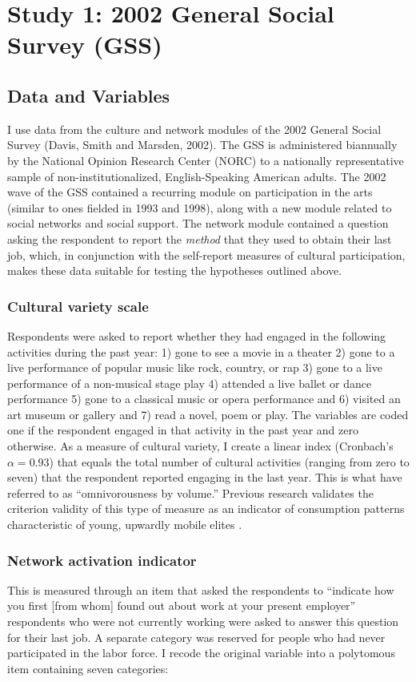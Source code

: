 \documentclass[12pt]{article}
\begin{document}
\section{Study 1:  2002 General Social Survey (GSS)}
\subsection{Data and Variables}
I use data from the culture and network modules of the 2002 General Social Survey (Davis, Smith and Marsden, 2002). The GSS is administered biannually by the National Opinion Research Center (NORC) to a nationally representative sample of non-institutionalized, English-Speaking American adults. The 2002 wave of the GSS contained a recurring module on participation in the arts (similar to ones fielded in 1993 and 1998), along with a new module related to social networks and social support. The network module contained a question asking the respondent to report the \emph{method} that they used to obtain their last job, which, in conjunction with the self-report measures of cultural participation, makes these data suitable for testing the hypotheses outlined above.

\subsubsection{Cultural variety scale}
Respondents were asked to report whether they had engaged in the following activities during the past year: 1) gone to see a movie in a theater 2) gone to a live performance of popular music like rock, country, or rap 3) gone to a live performance of a non-musical stage play 4) attended a live ballet or dance performance 5) gone to a classical music or opera performance and 6) visited an art museum or gallery and 7) read a novel, poem or play. The variables are coded one if the respondent engaged in that activity in the past year and zero otherwise. As a measure of cultural variety, I create a linear index (Cronbach's $\alpha=0.93$) that equals the total number of cultural activities (ranging from zero to seven) that the respondent reported engaging in the last year.  This is what \citep{warde_etal08} have referred to as ``omnivorousness by volume.'' Previous research validates the criterion validity of this type of measure as an indicator of consumption patterns characteristic of young, upwardly mobile elites \citep[e.g.][]{bryson96, sullivan_katzgerro07, warde_etal08}.

\subsubsection{Network activation indicator}
This is measured through an item that asked the respondents to ``indicate how you first [from whom] found out about work at your present employer'' respondents who were not currently working were asked to answer this question for their last job. A separate category was reserved for people who had never participated in the labor force. I recode the original variable into a polytomous item containing seven categories: 
\end{document}
